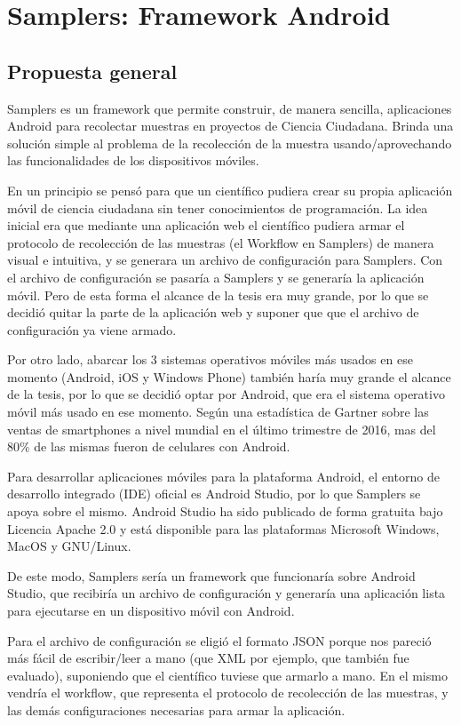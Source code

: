 \chapter{Samplers: Framework Android}

\section{Propuesta general}
Samplers es un framework que permite construir, de manera sencilla, aplicaciones Android para recolectar muestras en proyectos de Ciencia Ciudadana. Brinda una solución simple al problema de la recolección de la muestra usando/aprovechando las funcionalidades de los dispositivos móviles.

En un principio se pensó para que un científico pudiera crear su propia aplicación móvil de ciencia ciudadana sin tener conocimientos de programación. La idea inicial era que mediante una aplicación web el científico pudiera armar el protocolo de recolección de las muestras (el Workflow en Samplers) de manera visual e intuitiva, y se generara un archivo de configuración para Samplers. Con el archivo de configuración se pasaría a Samplers y se generaría la aplicación móvil. Pero de esta forma el alcance de la tesis era muy grande, por lo que se decidió quitar la parte de la aplicación web y suponer que que el archivo de configuración ya viene armado.

Por otro lado, abarcar los 3 sistemas operativos móviles más usados en ese momento (Android, iOS y Windows Phone) también haría muy grande el alcance de la tesis, por lo que se decidió optar por Android, que era el sistema operativo móvil más usado en ese momento. Según una estadística de Gartner sobre las ventas de smartphones a nivel mundial en el último trimestre de 2016\cite{gartner}, mas del 80\% de las mismas fueron de celulares con Android.

Para desarrollar aplicaciones móviles para la plataforma Android, el entorno de desarrollo integrado (IDE) oficial es Android Studio\cite{androidStudio}, por lo que Samplers se apoya sobre el mismo. Android Studio ha sido publicado de forma gratuita bajo Licencia Apache 2.0 y está disponible para las plataformas Microsoft Windows, MacOS y GNU/Linux.

De este modo, Samplers sería un framework que funcionaría sobre Android Studio, que recibiría un archivo de configuración y generaría una aplicación lista para ejecutarse en un dispositivo móvil con Android.

Para el archivo de configuración se eligió el formato JSON porque nos pareció más fácil de escribir/leer a mano (que XML por ejemplo, que también fue evaluado), suponiendo que el científico tuviese que armarlo a mano. En el mismo vendría el workflow, que representa el protocolo de recolección de las muestras, y las demás configuraciones necesarias para armar la aplicación.


